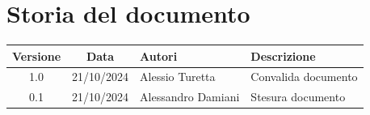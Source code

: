\section{Storia del documento}
\begin{center}
    \begin{tabular}{ c c p{2.5cm} p{5cm} }
        \rowcolor{gray!20}\rule{0pt}{0.5cm}\textbf{Versione} & \textbf{Data} & \textbf{Autori} & \textbf{Descrizione} \\[0.7ex]
        \hline
        \rule{0pt}{0.5cm}1.0 & 21/10/2024 & Alessio Turetta & Convalida documento\\[0.7ex]
        \rule{0pt}{0.5cm}0.1 & 21/10/2024 & Alessandro Damiani & Stesura documento\\[0.7ex]
    \end{tabular}
\end{center}